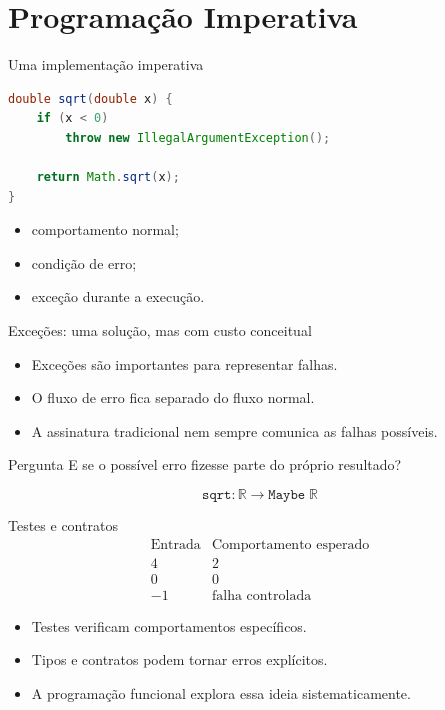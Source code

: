 \documentclass[aspectratio=169,11pt]{beamer}
\begin{document}
\section{Programação Imperativa}

\begin{frame}[fragile]{Uma implementação imperativa}
    \begin{lstlisting}[language=Java]
double sqrt(double x) {
    if (x < 0)
        throw new IllegalArgumentException();

    return Math.sqrt(x);
}
\end{lstlisting}
    \begin{itemize}
        \item comportamento normal;
        \item condição de erro;
        \item exceção durante a execução.
    \end{itemize}
\end{frame}

\begin{frame}{Exceções: uma solução, mas com custo conceitual}
    \begin{itemize}
        \item Exceções são importantes para representar falhas.
        \item O fluxo de erro fica separado do fluxo normal.
        \item A assinatura tradicional nem sempre comunica as falhas possíveis.
    \end{itemize}
    \begin{exampleblock}{Pergunta}
        E se o possível erro fizesse parte do próprio resultado?
    \end{exampleblock}
    \[
        \texttt{sqrt}:\mathbb{R}\longrightarrow\texttt{Maybe}\;\mathbb{R}
    \]
\end{frame}

\begin{frame}{Testes e contratos}
    \[
        \begin{array}{c|c}
            \text{Entrada} & \text{Comportamento esperado} \\ \hline
            4              & 2                             \\
            0              & 0                             \\
            -1             & \text{falha controlada}
        \end{array}
    \]
    \begin{itemize}
        \item Testes verificam comportamentos específicos.
        \item Tipos e contratos podem tornar erros explícitos.
        \item A programação funcional explora essa ideia sistematicamente.
    \end{itemize}
\end{frame}
\end{document}
